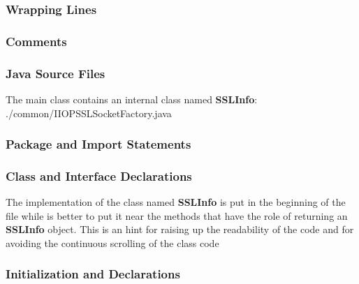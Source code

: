 \subsubsection{Wrapping Lines}
\begin{itemize}
\end{itemize}

\subsubsection{Comments}
\begin{itemize}
\end{itemize}

\subsubsection{Java Source Files}
\begin{itemize}
		The main class contains an internal class named \textbf{SSLInfo}:
		{./common/IIOPSSLSocketFactory.java}
\end{itemize}

\subsubsection{Package and Import Statements}
\begin{itemize}
\end{itemize}

\subsubsection{Class and Interface Declarations}
\begin{itemize}
		The implementation of the class named \textbf{SSLInfo} is put in the beginning of the file while is better to put it near the methods that have the role of returning an \textbf{SSLInfo} object.
		This is an hint for raising up the readability of the code and for avoiding the continuous scrolling of the class code
\end{itemize}

\subsubsection{Initialization and Declarations}
\begin{itemize}
\end{itemize}

